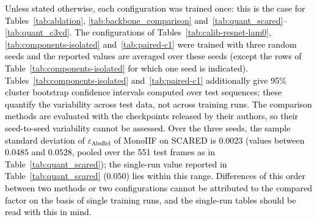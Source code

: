 \documentclass[a4paper,fleqn]{cas-dc}
\begin{document}
{\textcolor{black}
{
Unless stated otherwise, each configuration was trained once: this is the case for
Tables~\ref{tab:ablation}, \ref{tab:backbone_comparison} and~\ref{tab:quant_scared}--\ref{tab:quant_c3vd}.
The configurations of Tables~\ref{tab:calib-resnet-lam0}, \ref{tab:components-isolated}
and~\ref{tab:paired-c1} were trained with three random seeds and the reported values are averaged over these seeds \textcolor{black}{(except the rows of Table~\ref{tab:components-isolated} for which one seed is indicated)}. Tables~\ref{tab:components-isolated} and~\ref{tab:paired-c1} additionally
give 95\% cluster bootstrap confidence intervals computed over test sequences; these quantify the
variability across test data, not across training runs. The comparison methods are evaluated with
the checkpoints released by their authors, so their seed-to-seed variability cannot be assessed.
Over the three seeds, the sample standard deviation of $\varepsilon_\textrm{AbsRel}$ of MonoIIF on
SCARED is $0.0023$ (values between $0.0485$ and $0.0528$, pooled over the 551 test frames as in
Table~\ref{tab:quant_scared}); the single-run value reported in Table~\ref{tab:quant_scared}
($0.050$) lies within this range. Differences of this order between two methods or two
configurations cannot be attributed to the compared factor on the basis of single training runs,
and the single-run tables should be read with this in mind.}
}
\end{document}
